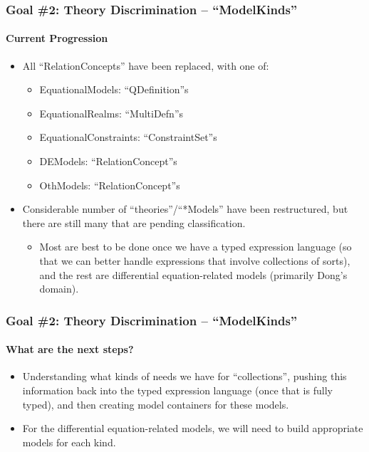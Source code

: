 \documentclass{beamer}
\begin{document}
\begin{frame}
    \frametitle{Goal \#2: Theory Discrimination -- ``ModelKinds''}
    \framesubtitle{Current Progression}
    
    \begin{itemize}
        \item<2-> All ``RelationConcepts'' have been replaced, with one of:
            \begin{itemize}
                \item<3-> EquationalModels: ``QDefinition''s
                \item<4-> EquationalRealms: ``MultiDefn''s
                \item<5-> EquationalConstraints: ``ConstraintSet''s
                \item<6-> DEModels: ``RelationConcept''s
                \item<7-> OthModels: ``RelationConcept''s
            \end{itemize}
        \item<8-> Considerable number of ``theories''/``*Models'' have been restructured, but there are still many that are pending classification.
            \begin{itemize}
                \item<9-> Most are best to be done once we have a typed expression language (so that we can better handle expressions that involve collections of sorts), and the rest are differential equation-related models (primarily Dong's domain).
            \end{itemize}
    \end{itemize}
\end{frame}

\begin{frame}
    \frametitle{Goal \#2: Theory Discrimination -- ``ModelKinds''}
    \framesubtitle{What are the next steps?}
    
    \begin{itemize}
        \item<2-> Understanding what kinds of needs we have for ``collections'', pushing this information back into the typed expression language (once that is fully typed), and then creating model containers for these models.
        \item<3-> For the differential equation-related models, we will need to build appropriate models for each kind.
    \end{itemize}
\end{frame}
\end{document}
